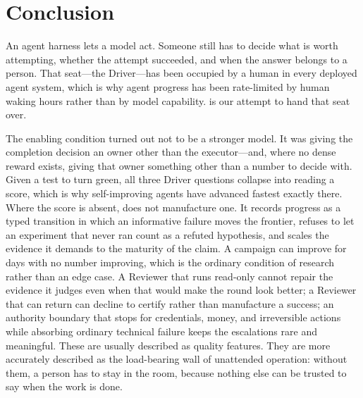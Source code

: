 \section{Conclusion}
\label{sec:conclusion}

An agent harness lets a model act. Someone still has to decide what is worth
attempting, whether the attempt succeeded, and when the answer belongs to a person.
That seat---the Driver---has been occupied by a human in every deployed agent system,
which is why agent progress has been rate-limited by human waking hours rather than
by model capability. \systemname{} is our attempt to hand that seat over.

The enabling condition turned out not to be a stronger model. It was giving the
completion decision an owner other than the executor---and, where no dense reward
exists, giving that owner something other than a number to decide with. Given a test
to turn green, all three Driver questions collapse into reading a score, which is why
self-improving agents have advanced fastest exactly there. Where the score is absent,
\systemname{} does not manufacture one. It records progress as a typed transition in
which an informative failure moves the frontier, refuses to let an experiment that
never ran count as a refuted hypothesis, and scales the evidence it demands to the
maturity of the claim. A campaign can improve for days with no number improving,
which is the ordinary condition of research rather than an edge case. A Reviewer that runs read-only
cannot repair the evidence it judges even when that would make the round look
better; a Reviewer that can return  can decline to certify rather than
manufacture a success; an authority boundary that stops for credentials, money, and
irreversible actions while absorbing ordinary technical failure keeps the escalations
rare and meaningful. These are usually described as quality features. They are more
accurately described as the load-bearing wall of unattended operation: without them,
a person has to stay in the room, because nothing else can be trusted to say when the
work is done.

